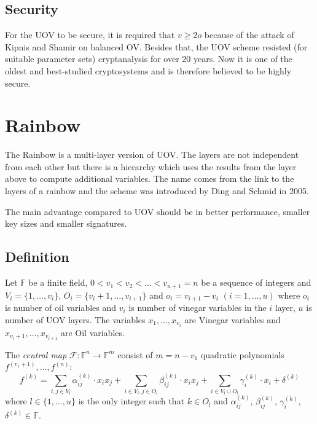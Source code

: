 \documentclass[thesis=M,english]{FITthesis}[2019/12/23]
\begin{document}
\subsection{Security}
For the UOV to be secure, it is required that $v \geq 2o$ because of the attack of Kipnis and Shamir on balanced OV.\cite{L-KS98} Besides that, the UOV scheme resisted (for suitable parameter sets) cryptanalysis for over 20 years. Now it is one of the oldest and best-studied cryptosystems and is therefore believed to be highly secure.

\newpage
\section{Rainbow}
The Rainbow is a multi-layer version of UOV. The layers are not independent from each other but there is a hierarchy which uses the results from the layer above to compute additional variables. The name comes from the link to the layers of a rainbow and the scheme was introduced by Ding and Schmid in 2005.

\bigskip
\noindent
The main advantage compared to UOV should be in better performance, smaller key sizes and smaller signatures.

\subsection{Definition}\label{rb-definition}
Let $\mathbb{F}$ be a finite field, $0<v_1<v_2<\ldots<v_{u+1} = n$ be a sequence of integers and $V_i=\{1, \ldots, v_i\}$, $O_i=\{v_i+1, \ldots, v_{i+1}\}$ and $o_i = v_{i+1} - v_i \,\, (i=1,\ldots,u)$ where $o_i$ is number of oil variables and $v_i$ is number of vinegar variables in the $i$ layer, $u$ is number of UOV layers. The variables $x_1, \ldots, x_{v_i}$ are Vinegar variables and $x_{v_{i}+1}, \ldots, x_{v_{i+1}}$ are Oil variables.

\bigskip
\noindent
The \textit{central map} $\mathcal{F}:\mathbb{F}^n \rightarrow \mathbb{F}^m$ consist of $m = n - v_1$ quadratic polynomials $f^{(v_1+1)}, \ldots, f^{(n)}$:
\[
f^{(k)} = \sum\limits_{i,j \in V_l}{\alpha_{ij}^{(k)} \cdot x_ix_j} + \sum\limits_{i \in V_l,j \in O_l}{\beta_{ij}^{(k)} \cdot x_ix_j}+ \sum\limits_{i \in V_l \cup O_l}{\gamma_{i}^{(k)} \cdot x_i} + \delta^{(k)}
\]
where $l \in \{1, \ldots, u\}$ is the only integer such that $k \in O_l$ and $\alpha_{ij}^{(k)}$, $\beta_{ij}^{(k)}$, $\gamma_{i}^{(k)}$, $\delta^{(k)} \in \mathbb{F}$.
\end{document}
